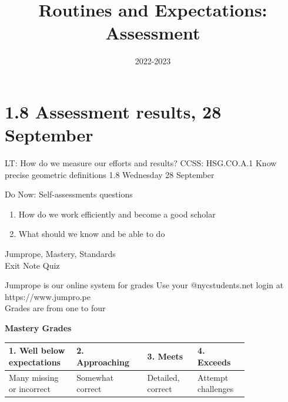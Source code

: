 

\title{Routines and Expectations: Assessment}
\date{2022-2023}


\frame{\titlepage}

\section[Outline]{}
\frame{\tableofcontents}

\section{1.8 Assessment results, 28 September}
\begin{frame}{LT: How do we measure our efforts and results?}
  {CCSS: HSG.CO.A.1 Know precise geometric definitions  \hfill \alert{1.8 Wednesday 28 September}}
  \begin{block}{Do Now: Self-assessments questions}
  \begin{enumerate}
      \item How do we work efficiently and become a good scholar
      \item What should we know and be able to do
  \end{enumerate}
  \end{block}
  Jumprope, Mastery, Standards \\
  Exit Note Quiz
\end{frame}

\begin{frame}{Jumprope is our online system for grades}
  Use your @nycstudents.net login at https://www.jumpro.pe \\[0.25cm]
    Grades are from one to four \vspace{0.5cm}
    \begin{table}[ht]
      \textbf{Mastery Grades}
      \begin{tabular}[t]{p{0.20\linewidth} p{0.25\linewidth} p{0.18\linewidth} p{0.18\linewidth}}
        \hline
        1. Well below \newline expectations & 2. Approaching & 3. Meets & 4. Exceeds \\
        \hline
        Many missing or incorrect & Somewhat \newline correct & Detailed, \newline correct & Attempt \newline challenges \\[0.25cm]
        \hline
      \end{tabular}
    \end{table} \vspace{0.25cm}
\end{frame}

